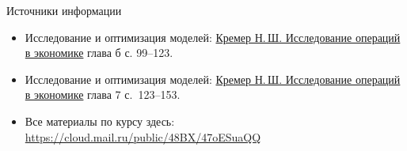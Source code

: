 \documentclass[unicode,11pt,notheorems,xcolor=table]{beamer}
\begin{document}
\begin{frame}{Источники информации}
\begin{itemize}
\item {}
	Исследование и оптимизация моделей:  {\color{blue}\href{https://cloud.mail.ru/public/4SN3/2MJYgEz95}{Кремер  Н.\,Ш. Исследование операций в экономике}} глава б с. 99--123.
\item {}
	Исследование и оптимизация моделей:  {\color{blue}\href{https://cloud.mail.ru/public/4SN3/2MJYgEz95}{Кремер  Н.\,Ш. Исследование операций в экономике}} глава 7 с.~123--153.

\item 
	Все материалы по курсу здесь:
{\color{blue}\url{https://cloud.mail.ru/public/48BX/47oESuaQQ}}
\end{itemize}

\end{frame}
\end{document}
